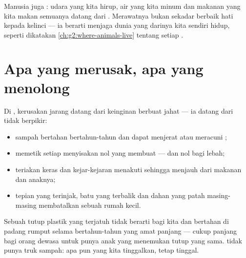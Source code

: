 \begin{remark}\label{rem:g2:caring-for-nature:part}
Manusia juga : udara yang kita hirup, air yang kita minum
dan makanan yang kita makan semuanya datang dari . Merawatnya
bukan sekadar berbaik hati kepada kelinci --- ia berarti menjaga dunia
yang darinya kita sendiri hidup, seperti dikatakan
\cref{ch:g2:where-animals-live} tentang setiap .
\end{remark}

\section{Apa yang merusak, apa yang menolong}

\begin{proposition}\label{prop:g2:caring-for-nature:harm}
Di , kerusakan jarang datang dari keinginan berbuat jahat --- ia
datang dari tidak berpikir:
\begin{itemize}
  \item sampah bertahan bertahun-tahun dan dapat menjerat atau
        meracuni ;
  \item memetik setiap  menyisakan nol  yang membuat 
        --- dan nol  bagi lebah;
  \item teriakan keras dan kejar-kejaran menakuti  sehingga
        menjauh dari makanan dan anaknya;
  \item tepian yang terinjak, batu yang terbalik dan dahan yang patah
        masing-masing membatalkan sebuah rumah kecil.
\end{itemize}
\end{proposition}
\admitted

\begin{example}\label{ex:g2:caring-for-nature:cap}
Sebuah tutup plastik yang terjatuh tidak berarti bagi kita dan
bertahan di padang rumput selama bertahun-tahun yang amat panjang ---
cukup panjang bagi orang dewasa untuk punya anak yang menemukan tutup
yang sama.  tidak punya truk sampah: apa pun yang kita
tinggalkan, tetap tinggal.
\end{example}

